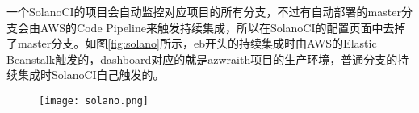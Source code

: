 一个SolanoCI的项目会自动监控对应项目的所有分支，不过有自动部署的master分支会由AWS的Code Pipeline来触发持续集成，所以在SolanoCI的配置页面中去掉了master分支。如图\ref{fig:solano}所示，eb开头的持续集成时由AWS的Elastic Beanstalk触发的，dashboard对应的就是azwraith项目的生产环境，普通分支的持续集成时SolanoCI自己触发的。
\begin{figure}[!htp]
 \centering
 \texttt{[image: solano.png]}
\end{figure}

